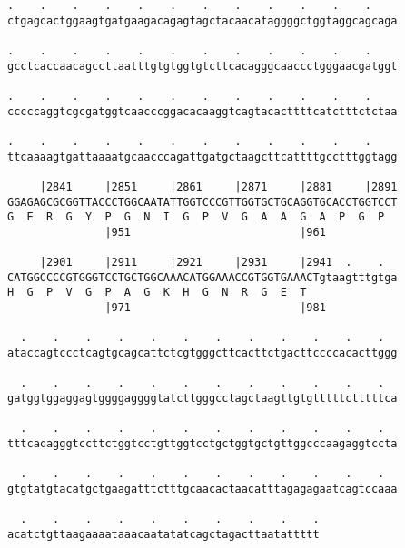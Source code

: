 \documentclass{article}
\begin{document}
\begin{Verbatim}
.    .    .    .    .    .    .    .    .    .    .    .    
ctgagcactggaagtgatgaagacagagtagctacaacataggggctggtaggcagcaga
                                                            
.    .    .    .    .    .    .    .    .    .    .    .    
gcctcaccaacagccttaatttgtgtggtgtcttcacagggcaaccctgggaacgatggt
                                                            
.    .    .    .    .    .    .    .    .    .    .    .    
cccccaggtcgcgatggtcaacccggacacaaggtcagtacacttttcatctttctctaa
                                                            
.    .    .    .    .    .    .    .    .    .    .    .    
ttcaaaagtgattaaaatgcaacccagattgatgctaagcttcattttgcctttggtagg
                                                            
     |2841     |2851     |2861     |2871     |2881     |2891
GGAGAGCGCGGTTACCCTGGCAATATTGGTCCCGTTGGTGCTGCAGGTGCACCTGGTCCT
G  E  R  G  Y  P  G  N  I  G  P  V  G  A  A  G  A  P  G  P  
               |951                          |961           
  
     |2901     |2911     |2921     |2931     |2941  .    .  
CATGGCCCCGTGGGTCCTGCTGGCAAACATGGAAACCGTGGTGAAACTgtaagtttgtga
H  G  P  V  G  P  A  G  K  H  G  N  R  G  E  T              
               |971                          |981           
  
  .    .    .    .    .    .    .    .    .    .    .    .  
ataccagtccctcagtgcagcattctcgtgggcttcacttctgacttccccacacttggg
                                                            
  .    .    .    .    .    .    .    .    .    .    .    .  
gatggtggaggagtggggaggggtatcttgggcctagctaagttgtgtttttctttttca
                                                            
  .    .    .    .    .    .    .    .    .    .    .    .  
tttcacagggtccttctggtcctgttggtcctgctggtgctgttggcccaagaggtccta
                                                            
  .    .    .    .    .    .    .    .    .    .    .    .  
gtgtatgtacatgctgaagatttctttgcaacactaacatttagagagaatcagtccaaa
                                                            
  .    .    .    .    .    .    .    .    .    .
acatctgttaagaaaataaacaatatatcagctagacttaatattttt
                                                
                                                
 

\end{Verbatim}
\end{document}
